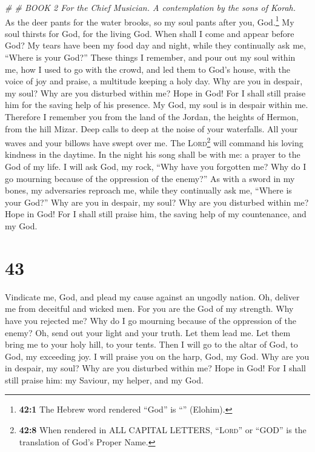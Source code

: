 \emph{\# \# BOOK 2 For the Chief Musician. A contemplation by the sons
of Korah.}\\
 As the deer pants for the water brooks, so my soul pants
after you, God.\footnote{\textbf{42:1} The Hebrew word rendered ``God''
  is ``'' (Elohim).}  My soul thirsts for
God, for the living God. When shall I come and appear before God?
 My tears have been my food day and night, while they
continually ask me, ``Where is your God?''  These things I
remember, and pour out my soul within me, how I used to go with the
crowd, and led them to God's house, with the voice of joy and praise, a
multitude keeping a holy day.  Why are you in despair, my
soul? Why are you disturbed within me? Hope in God! For I shall still
praise him for the saving help of his presence.  My God,
my soul is in despair within me. Therefore I remember you from the land
of the Jordan, the heights of Hermon, from the hill Mizar.
 Deep calls to deep at the noise of your waterfalls. All
your waves and your billows have swept over me.  The
\textsc{Lord}\footnote{\textbf{42:8} When rendered in ALL CAPITAL
  LETTERS, ``\textsc{Lord}'' or ``GOD'' is the translation of God's
  Proper Name.} will command his loving kindness in the daytime. In the
night his song shall be with me: a prayer to the God of my life.
 I will ask God, my rock, ``Why have you forgotten me? Why
do I go mourning because of the oppression of the enemy?''
 As with a sword in my bones, my adversaries reproach me,
while they continually ask me, ``Where is your God?'' 
Why are you in despair, my soul? Why are you disturbed within me? Hope
in God! For I shall still praise him, the saving help of my countenance,
and my God.

\hypertarget{section-42}{%
\section{43}\label{section-42}}

 Vindicate me, God, and plead my cause against an ungodly
nation. Oh, deliver me from deceitful and wicked men.  For
you are the God of my strength. Why have you rejected me? Why do I go
mourning because of the oppression of the enemy?  Oh, send
out your light and your truth. Let them lead me. Let them bring me to
your holy hill, to your tents.  Then I will go to the
altar of God, to God, my exceeding joy. I will praise you on the harp,
God, my God.  Why are you in despair, my soul? Why are you
disturbed within me? Hope in God! For I shall still praise him: my
Saviour, my helper, and my God.

